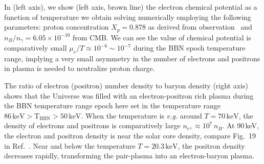 In  (left axis), we show (left axis, brown line) the electron chemical potential as a function of temperature we obtain solving  numerically employing the following parameters: proton concentration $X_p=0.878$ as derived from observation~\cite{ParticleDataGroup:2022pth} and $n_B/n_\gamma=6.05\times10^{-10}$ from CMB. We can see the value of chemical potential is comparatively small $\mu_e/T\approx10^{-6}\sim10^{-7}$ during the BBN epoch temperature range, implying a very small asymmetry in the number of electrons and positrons in plasma is needed to neutralize proton charge. 

The ratio of electron (positron) number density to baryon density (right axis) shows that the Universe was filled with an electron-positron rich plasma during the BBN temperature range epoch here set in the temperature range $86\,\mathrm{keV}>\mathrm{T_{BBN}}>50\,\mathrm{keV}$. When the temperature is {\it e.g.\/} around $T=70\,\mathrm{keV}$, the density of electrons and positrons is comparatively large $n_{e^\pm}\approx10^7\,n_B$. At $90$\,keV, the electron and positron density is near the solar core density, compare Fig.~19 in Ref.~\cite{Rafelski:2023emw}. Near and below   the temperature  $T=20.3\,\mathrm{keV}$, the positron density decreases rapidly, transforming the pair-plasma into an electron-baryon plasma.

